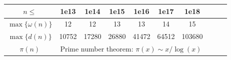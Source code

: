 \begin{table}[H]
\begin{tabular}{|c|c|c|c|c|c|c|c|c|c|}
			\hline
			\rowcolor{black!10} $n \leq$ & 1e13& 1e14& 1e15& 1e16& 1e17& 1e18 \\
			\hline
			$\max\{\omega(n)\}$ & 12 & 12 & 13 & 13 & 14 & 15 \\
			\hline
			$\max\{d(n)\}$ & 10752 & 17280 & 26880 & 41472 & 64512 & 103680\\
			\hline
			$\pi(n)$ & \multicolumn{6}{c|}{Prime number theorem: $\pi(x) \sim x / \log (x)$} \\
			\hline
			\end{tabular}
\begin{comment}
		\begin{tabular}{|r|r|r|r|}
			\hline
			n  & LCM(1...n)  & Pn  & Bn \\
			\hline
			2  & 2  & 2  & 2 \\
			\hline
			3  & 6  & 3  & 5 \\
			\hline
			4  & 12  & 5  & 15 \\
			\hline
			5  & 60  & 7  & 52 \\
			\hline
			6  & 60  & 11  & 203 \\
			\hline
			7  & 420  & 15  & 877 \\
			\hline
			8  & 840  & 22  & 4140 \\
			\hline
			9  & 2520  & 30  & 21147 \\
			\hline
			10  & 2520  & 42  & 115975 \\
			\hline
			11  & 27720  & 56  & 678570 \\
			\hline
			12  & 27720  & 77  & 4213597 \\
			\hline
			15  & 360360  & 176  & 1382958545 \\
			\hline
			20  & 232792560  & 627  &  \\
			\hline
			25  &   & 1958  &  \\
			\hline
			30  &   & 5604  &  \\
			\hline
			40  &   & 37338  &  \\
			\hline
			50  &   & 204226  &  \\
			\hline
			70  &   & 4087968  &  \\
			\hline
			100  &   & 190569292  &  \\
			\hline
		\end{tabular}
\end{comment}
	\end{table}